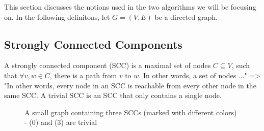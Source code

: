 \documentclass[../master/master.tex]{subfiles}
\begin{document}
This section discusses the notions used in the two algorithms we will be focusing on. In the following definitons, let $G=(V,E)$ be a directed graph.

\subsection{Strongly Connected Components}
A strongly connected component (SCC) is a maximal set of nodes $C\subseteq V$, such that $\forall v,w\in C$, there is a path from $v$ to $w$. In other words, a set of nodes ..." => "In other words, every node in an SCC is reachable from every other node in the same SCC. A trivial SCC is an SCC that only contains a single node.
\begin{figure}[H]
\center
{}
\caption{A small graph containing three SCCs (marked with different colors) - (0) and (3) are trivial}
\end{figure}
\end{document}
